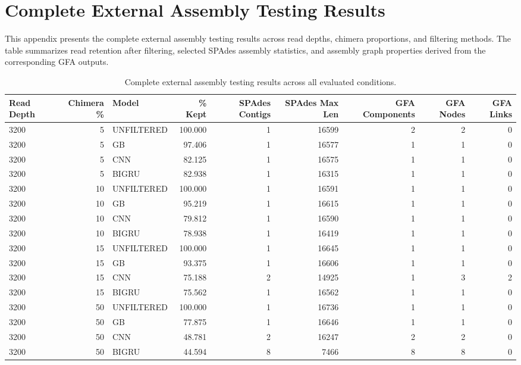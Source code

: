 \chapter{Complete External Assembly Testing Results}
\label{app:assembly_tables}

This appendix presents the complete external assembly testing results across read depths, chimera proportions, and filtering methods. The table summarizes read retention after filtering, selected SPAdes assembly statistics, and assembly graph properties derived from the corresponding GFA outputs.

\begin{landscape}
\begin{table}[htbp]
\centering
\scriptsize
\caption{Complete external assembly testing results across all evaluated conditions.}
\label{tab:assembly_results_full}
\begin{tabular}{lrlrrrrrr}
\toprule
Read Depth & Chimera \% & Model & \% Kept & SPAdes Contigs & SPAdes Max Len & GFA Components & GFA Nodes & GFA Links \\
\midrule
3200 & 5  & UNFILTERED & 100.000 & 1 & 16599 & 2 & 2 & 0 \\
3200 & 5  & GB         & 97.406  & 1 & 16577 & 1 & 1 & 0 \\
3200 & 5  & CNN        & 82.125  & 1 & 16575 & 1 & 1 & 0 \\
3200 & 5  & BIGRU      & 82.938  & 1 & 16315 & 1 & 1 & 0 \\

3200 & 10 & UNFILTERED & 100.000 & 1 & 16591 & 1 & 1 & 0 \\
3200 & 10 & GB         & 95.219  & 1 & 16615 & 1 & 1 & 0 \\
3200 & 10 & CNN        & 79.812  & 1 & 16590 & 1 & 1 & 0 \\
3200 & 10 & BIGRU      & 78.938  & 1 & 16419 & 1 & 1 & 0 \\

3200 & 15 & UNFILTERED & 100.000 & 1 & 16645 & 1 & 1 & 0 \\
3200 & 15 & GB         & 93.375  & 1 & 16606 & 1 & 1 & 0 \\
3200 & 15 & CNN        & 75.188  & 2 & 14925 & 1 & 3 & 2 \\
3200 & 15 & BIGRU      & 75.562  & 1 & 16562 & 1 & 1 & 0 \\

3200 & 50 & UNFILTERED & 100.000 & 1 & 16736 & 1 & 1 & 0 \\
3200 & 50 & GB         & 77.875  & 1 & 16646 & 1 & 1 & 0 \\
3200 & 50 & CNN        & 48.781  & 2 & 16247 & 2 & 2 & 0 \\
3200 & 50 & BIGRU      & 44.594  & 8 & 7466  & 8 & 8 & 0 \\


\end{tabular}
\end{table}
\end{landscape}
